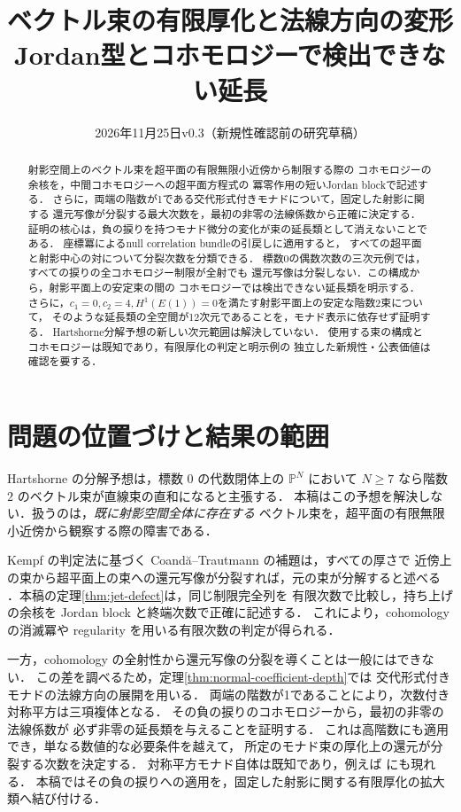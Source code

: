 \documentclass[a4paper,11pt]{ltjsarticle}
\title{ベクトル束の有限厚化と法線方向の変形\texorpdfstring{\\}{ }Jordan型とコホモロジーで検出できない延長}
\author{}
\date{2026年11月25日\quad v0.3（新規性確認前の研究草稿）}
\numberwithin{equation}{section}
\theoremstyle{plain}
\theoremstyle{definition}
\theoremstyle{remark}
\begin{document}
\maketitle
\begin{abstract}
射影空間上のベクトル束を超平面の有限無限小近傍から制限する際の
コホモロジーの余核を，中間コホモロジーへの超平面方程式の
冪零作用の短いJordan blockで記述する．
さらに，両端の階数が1である交代形式付きモナドについて，固定した射影に関する
還元写像が分裂する最大次数を，最初の非零の法線係数から正確に決定する．
証明の核心は，負の捩りを持つモナド微分の変化が束の延長類として消えないことである．
座標冪によるnull correlation bundleの引戻しに適用すると，
すべての超平面と射影中心の対について分裂次数を分類できる．
標数0の偶数次数の三次元例では，すべての捩りの全コホモロジー制限が全射でも
還元写像は分裂しない．この構成から，射影平面上の安定束の間の
コホモロジーでは検出できない延長類を明示する．
さらに，$c_1=0,c_2=4,H^1(E(1))=0$を満たす射影平面上の安定な階数2束について，
そのような延長類の全空間が12次元であることを，モナド表示に依存せず証明する．
Hartshorne分解予想の新しい次元範囲は解決していない．
使用する束の構成とコホモロジーは既知であり，有限厚化の判定と明示例の
独立した新規性・公表価値は確認を要する．
\end{abstract}
\tableofcontents

\section{問題の位置づけと結果の範囲}

Hartshorne の分解予想は，標数 $0$ の代数閉体上の $\mathbb P^N$ において
$N\geq 7$ なら階数 $2$ のベクトル束が直線束の直和になると主張する．
本稿はこの予想を解決しない．扱うのは，\emph{既に射影空間全体に存在する}
ベクトル束を，超平面の有限無限小近傍から観察する際の障害である．

Kempf の判定法に基づく Coand\u{a}--Trautmann の補題は，すべての厚さで
近傍上の束から超平面上の束への還元写像が分裂すれば，元の束が分解すると述べる
\cite{CoandaTrautmann2006}．本稿の定理\ref{thm:jet-defect}は，同じ制限完全列を
有限次数で比較し，持ち上げの余核を Jordan block と終端次数で正確に記述する．
これにより，cohomology の消滅冪や regularity を用いる有限次数の判定が得られる．

一方，cohomology の全射性から還元写像の分裂を導くことは一般にはできない．
この差を調べるため，定理\ref{thm:normal-coefficient-depth}では
交代形式付きモナドの法線方向の展開を用いる．
両端の階数が1であることにより，次数付き対称平方は三項複体となる．
その負の捩りのコホモロジーから，最初の非零の法線係数が
必ず非零の延長類を与えることを証明する．
これは高階数にも適用でき，単なる数値的な必要条件を越えて，
所定のモナド束の厚化上の還元が分裂する次数を決定する．
対称平方モナド自体は既知であり，例えば
\cite[p.~8, 式(41)--(45)]{TikhomirovTikhomirovVasiliev2018}にも現れる．
本稿ではその負の捩りへの適用を，固定した射影に関する有限厚化の拡大類へ結び付ける．
\end{document}
